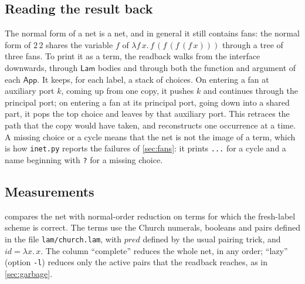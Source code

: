 \documentclass[11pt,a4paper]{article}
\newcommand{\ag}[1]{\mathsf{#1}}
\newcommand{\Lam}{\ag{Lam}}
\newcommand{\App}{\ag{App}}
\theoremstyle{definition}
\theoremstyle{plain}
\begin{document}
\subsection{Reading the result back}

The normal form of a net is a net, and in general it still contains fans:
the normal form of $2\,2$ shares the variable $f$ of $\lambda f\,x.\,f\,(f\,(f\,(f\,x)))$
through a tree of three fans. To print it as a term, the readback walks from
the interface downwards, through $\Lam$ bodies and through both the function
and argument of each $\App$. It keeps, for each label, a stack of choices. On
entering a fan at auxiliary port $k$, coming up from one copy, it pushes $k$
and continues through the principal port; on entering a fan at its principal
port, going down into a shared part, it pops the top choice and leaves by that
auxiliary port. This retraces the path that the copy would have taken, and
reconstructs one occurrence at a time. A missing choice or a cycle means that
the net is not the image of a term, which is how \texttt{inet.py} reports
the failures of \cref{sec:fans}: it prints \texttt{...} for a cycle and a
name beginning with \texttt{?} for a missing choice.

\subsection{Measurements}\label{sec:measure}

 compares the net with normal-order reduction on terms for
which the fresh-label scheme is correct. The terms use the Church numerals,
booleans and pairs defined in the file \texttt{lam/church.lam}, with
$\mathit{pred}$ defined by the usual pairing trick, and
$\mathit{id} = \lambda x.\,x$. The column ``complete'' reduces the whole
net, in any order; ``lazy'' (option \texttt{-l}) reduces only the active
pairs that the readback reaches, as in \cref{sec:garbage}.
\end{document}
